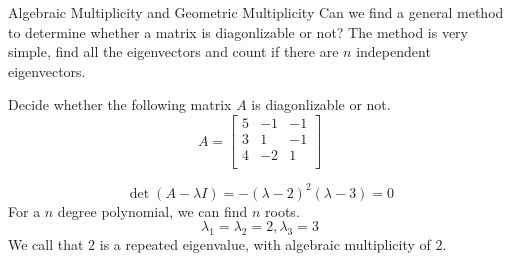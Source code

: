 \documentclass{beamer}
\begin{document}
\begin{frame}{Algebraic Multiplicity and Geometric Multiplicity}
Can we find a general method to determine whether a matrix is diagonlizable or not? The method is very simple, find all the eigenvectors and count if there are $n$ independent eigenvectors.

\begin{example}
    Decide whether the following matrix $A$ is diagonlizable or not.
    \begin{equation*}
        A=\left[ \begin{matrix}
            5&		-1&		-1\\
            3&		1&		-1\\
            4&		-2&		1\\
        \end{matrix} \right]
    \end{equation*}
\end{example}
\begin{equation*}
    \det \left( A-\lambda I \right) =-\left( \lambda -2 \right) ^2\left( \lambda -3 \right)=0
\end{equation*}
For a $n$ degree polynomial, we can find $n$ roots.
\begin{equation*}
    \lambda _1=\lambda _2=2,\lambda _3=3
\end{equation*}
We call that $2$ is a repeated eigenvalue, with algebraic multiplicity of $2$.
\end{frame}
\end{document}
